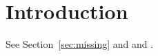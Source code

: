 \documentclass{article}
\begin{document}
\section{Introduction}\label{sec:intro}
See Section~\ref{sec:missing} and \cite{knuth84} and \cite{nokey}.






\end{document}
